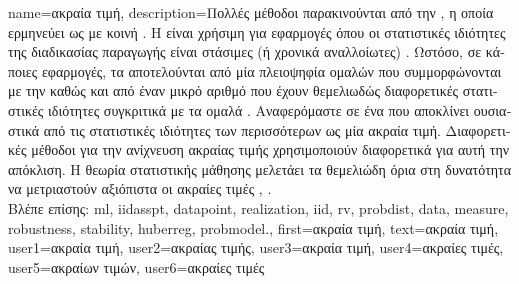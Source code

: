 {name={\foreignlanguage{greek}{ακραία τιμή}}, 
	description={\foreignlanguage{greek}{Πολλές μέθοδοι}   
		\foreignlanguage{greek}{παρακινούνται από την} , \foreignlanguage{greek}{η οποία ερμηνεύει} 
		 \foreignlanguage{greek}{ως}    
		\foreignlanguage{greek}{με κοινή} . \foreignlanguage{greek}{Η}  
		\foreignlanguage{greek}{είναι χρήσιμη για εφαρμογές όπου οι στατιστικές ιδιότητες της διαδικασίας παραγωγής} 
		 \foreignlanguage{greek}{είναι στάσιμες (ή χρονικά αναλλοίωτες)} \cite{Brockwell91}. 
		\foreignlanguage{greek}{Ωστόσο, σε κάποιες εφαρμογές, τα}  \foreignlanguage{greek}{αποτελούνται 
		από μία πλειοψηφία ομαλών}  \foreignlanguage{greek}{που συμμορφώνονται με την} 
		 \foreignlanguage{greek}{καθώς και από έναν μικρό αριθμό}  
		\foreignlanguage{greek}{που έχουν θεμελιωδώς διαφορετικές στατιστικές ιδιότητες συγκριτικά με τα ομαλά}  
        		. \foreignlanguage{greek}{Αναφερόμαστε σε ένα}  \foreignlanguage{greek}{που  
        		αποκλίνει ουσιαστικά από τις στατιστικές ιδιότητες των περισσότερων}  \foreignlanguage{greek}{ως μία
		ακραία τιμή. Διαφορετικές μέθοδοι για την  ανίχνευση ακραίας τιμής χρησιμοποιούν διαφορετικά}  
		\foreignlanguage{greek}{για αυτή την απόκλιση. Η θεωρία στατιστικής μάθησης μελετάει τα θεμελιώδη όρια στη δυνατότητα 
		να μετριαστούν αξιόπιστα οι ακραίες τιμές} \cite{doi:10.1137/0222052}, \cite{10.1214/20-AOS1961}.
		\\
       		\foreignlanguage{greek}{Βλέπε επίσης:} \gls{ml}, \gls{iidasspt}, \gls{datapoint}, \gls{realization}, \gls{iid}, \gls{rv}, \gls{probdist}, \gls{data}, 
		\gls{measure}, \gls{robustness}, \gls{stability}, \gls{huberreg}, \gls{probmodel}.},
	  first={\foreignlanguage{greek}{ακραία τιμή}}, 
	  text={\foreignlanguage{greek}{ακραία τιμή}},
	  user1={\foreignlanguage{greek}{ακραία τιμή}}, %
  	  user2={\foreignlanguage{greek}{ακραίας τιμής}}, %
	  user3={\foreignlanguage{greek}{ακραία τιμή}}, %
  	  user4={\foreignlanguage{greek}{ακραίες τιμές}}, %
	  user5={\foreignlanguage{greek}{ακραίων τιμών}}, %
  	  user6={\foreignlanguage{greek}{ακραίες τιμές}} %
}

